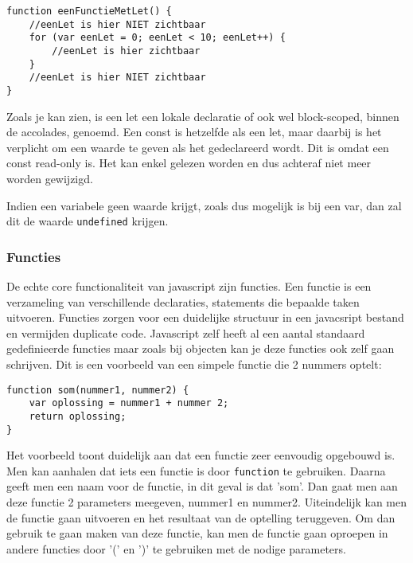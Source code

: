 \begin{lstlisting}[frame=single, caption=Een functie met let]
function eenFunctieMetLet() {
	//eenLet is hier NIET zichtbaar
	for (var eenLet = 0; eenLet < 10; eenLet++) {
		//eenLet is hier zichtbaar
	}
	//eenLet is hier NIET zichtbaar
}
\end{lstlisting}

Zoals je kan zien, is een let een lokale declaratie of ook wel block-scoped, binnen de accolades, genoemd. Een const is hetzelfde als een let, maar daarbij is het verplicht om een waarde te geven als het gedeclareerd wordt. Dit is omdat een const read-only is. Het kan enkel gelezen worden en dus achteraf niet meer worden gewijzigd.

Indien een variabele geen waarde krijgt, zoals dus mogelijk is bij een var, dan zal dit de waarde \lstinline[basicstyle=\ttfamily\color{red}]|undefined| krijgen.

\subsubsection{Functies}
\label{sssec:functies}
De echte core functionaliteit van javascript zijn functies. Een functie is een verzameling van verschillende declaraties, statements die bepaalde taken uitvoeren. Functies zorgen voor een duidelijke structuur in een javacsript bestand en vermijden duplicate code. Javascript zelf heeft al een aantal standaard gedefinieerde functies maar zoals bij objecten kan je deze functies ook zelf gaan schrijven. Dit is een voorbeeld van een simpele functie die 2 nummers optelt:

\begin{lstlisting}[frame=single, caption=Een functie die 2 getallen optelt]
function som(nummer1, nummer2) {
	var oplossing = nummer1 + nummer 2;
	return oplossing;
}
\end{lstlisting}

Het voorbeeld toont duidelijk aan dat een functie zeer eenvoudig opgebouwd is. Men kan aanhalen dat iets een functie is door  \lstinline[basicstyle=\ttfamily\color{red}]|function| te gebruiken. Daarna geeft men een naam voor de functie, in dit geval is dat 'som'. Dan gaat men aan deze functie 2 parameters meegeven, nummer1 en nummer2. Uiteindelijk kan men de functie gaan uitvoeren en het resultaat van de optelling teruggeven. Om dan gebruik te gaan maken van deze functie, kan men de functie gaan oproepen in andere functies door '(' en ')' te gebruiken met de nodige parameters.

